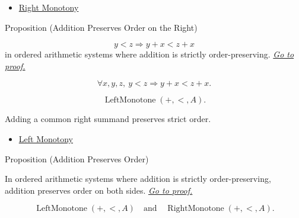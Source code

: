 \begin{dependencies}
\begin{itemize}
  \item \hyperref[def:right-monotony]{Right Monotony}
\end{itemize}
\end{dependencies}

\begin{propositionbox}{Proposition (Addition Preserves Order on the Right)}
\begin{proposition}
\label{prop:addition-order-compatibility-right}
\[
y<z \Longrightarrow y+x<z+x
\]
in ordered arithmetic systems where addition is strictly order-preserving.
\hyperref[prf:addition-order-compatibility-right]{\textit{Go to proof.}}
\end{proposition}
\end{propositionbox}

\begin{remark*}
\[
\forall x,y,z,\ y<z \Longrightarrow y+x<z+x.
\]
\end{remark*}

\begin{remark*}
\[
\operatorname{LeftMonotone}(+,<,A).
\]
\end{remark*}

\begin{remark*}[Interpretation]
Adding a common right summand preserves strict order.
\end{remark*}

\begin{dependencies}
\begin{itemize}
  \item \hyperref[def:left-monotony]{Left Monotony}
\end{itemize}
\end{dependencies}

\begin{propositionbox}{Proposition (Addition Preserves Order)}
\begin{proposition}
\label{prop:addition-order-compatibility}
In ordered arithmetic systems where addition is strictly order-preserving,
addition preserves order on both sides.
\hyperref[prf:addition-order-compatibility]{\textit{Go to proof.}}
\end{proposition}
\end{propositionbox}

\begin{remark*}
\[
\operatorname{LeftMonotone}(+,<,A)
\quad\text{and}\quad
\operatorname{RightMonotone}(+,<,A).
\]
\end{remark*}

